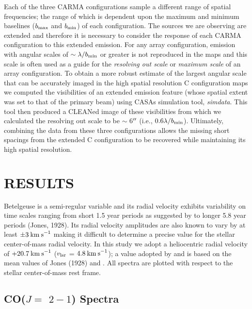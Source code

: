 \documentclass[iop]{emulateapj}
\begin{document}
Each of the three CARMA configurations sample a different range of spatial frequencies; the range of which is dependent upon the maximum and minimum baselines ($b_{\rm{max}}$ and $b_{\rm{min}}$) of each configuration. The sources we are observing are extended and therefore it is necessary to consider the response of each CARMA configuration to this extended emission. For any array configuration, emission with angular scales of $\sim \lambda/b_{\rm{min}}$ or greater is not reproduced in the maps \citep{1999ASPC..180.....T} and this scale is often used as a guide for the \textit{resolving out scale} or \textit{maximum scale} of an array configuration. To obtain a more robust estimate of the largest angular scale that can be accurately imaged in the high spatial resolution C configuration maps we computed the visibilities of an extended emission feature (whose spatial extent was set to that of the primary beam) using CASAs simulation tool, \textit{simdata}. This tool then produced a CLEANed image of these visibilities from which we calculated the resolving out scale to be $\sim$ 6$\mbox{$^{\prime\prime}$}$ (i.e., $0.6\lambda/b_{\rm{min}}$). Ultimately, combining the data from these three configurations allows the missing short spacings from the extended C configuration to be recovered while maintaining its high spatial resolution.

\section{RESULTS} 

Betelgeuse is a  semi-regular variable and its radial velocity exhibits variability on time scales ranging from short 1.5 year periods as suggested by \cite{1931PWasO..15..178S} to longer 5.8 year periods (Jones, 1928). Its radial velocity amplitudes are also known to vary by at least $\pm 3\>{\rm km\>s}^{-1}$ \citep{1989AJ.....98.2233S} making it difficult to determine a precise value for the stellar center-of-mass radial velocity. In this study we adopt a heliocentric radial velocity of $+20.7\>{\rm km\>s}^{-1}$ ($v_{\rm{lsr}}$ = $4.8\>{\rm km\>s}^{-1}$); a value adopted by \citet{2008AJ....135.1430H} and is based on the mean values of Jones (1928) and \cite{1933CMWCI.464....1S}. All spectra are plotted with respect to the stellar center-of-mass rest frame.

\subsection{CO($J=$ $2-1$) Spectra} \label{results1} %
\end{document}

